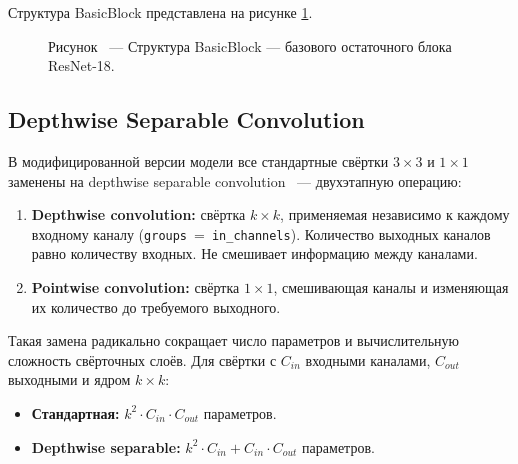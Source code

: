 Структура BasicBlock представлена на рисунке \ref{fig:basicblock}.

\begin{figure}[H]
    \centering
    \caption*{Рисунок \thefigure\ --- Структура BasicBlock — базового остаточного блока ResNet-18.}
    \label{fig:basicblock}
\end{figure}

\subsection{Depthwise Separable Convolution}

В модифицированной версии модели все стандартные свёртки $3 \times 3$ и $1 \times 1$ заменены на depthwise separable convolution~\cite{mobilenet} — двухэтапную операцию:

\begin{enumerate}
    \item \textbf{Depthwise convolution:} свёртка $k \times k$, применяемая независимо к каждому входному каналу (\texttt{groups}~=~\texttt{in\_channels}). Количество выходных каналов равно количеству входных. Не смешивает информацию между каналами.
    \item \textbf{Pointwise convolution:} свёртка $1 \times 1$, смешивающая каналы и изменяющая их количество до требуемого выходного.
\end{enumerate}

Такая замена радикально сокращает число параметров и вычислительную сложность свёрточных слоёв. Для свёртки с $C_{in}$ входными каналами, $C_{out}$ выходными и ядром $k \times k$:

\begin{itemize}
    \item \textbf{Стандартная:} $k^2 \cdot C_{in} \cdot C_{out}$ параметров.
    \item \textbf{Depthwise separable:} $k^2 \cdot C_{in} + C_{in} \cdot C_{out}$ параметров.
\end{itemize}

